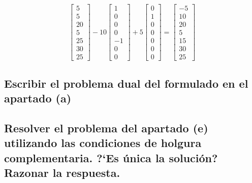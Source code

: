 \documentclass[10pt, a4paper]{article}
\begin{document}
			\[
			\begin{bmatrix}
				5 \\
				5 \\
				20 \\
				5 \\
				25 \\
				30 \\
				25
			\end{bmatrix}
			-10
			\begin{bmatrix}
				1 \\
				0 \\
				0 \\
				0 \\
				-1 \\
				0 \\
				0
			\end{bmatrix}
			+5
			\begin{bmatrix}
				0 \\
				1 \\
				0 \\
				0 \\
				0 \\
				0 \\
				0
			\end{bmatrix}
			=
			\begin{bmatrix}
				-5 \\
				10 \\
				20 \\
				5 \\
				15 \\
				30 \\
				25
			\end{bmatrix}
			\]

		\subsection{Escribir el problema dual del formulado en el apartado (a)}

			\paragraph{}


		\subsection{Resolver el problema del apartado (e) utilizando las condiciones de holgura complementaria. ?`Es única la solución? Razonar la respuesta.}

			\paragraph{}
\end{document}
